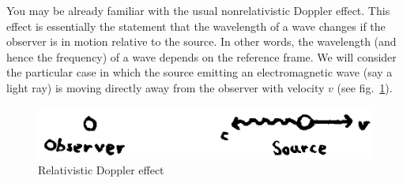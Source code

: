 \documentclass[11pt, a4paper,oneside,openright]{book}
\numberwithin{equation}{section}
\begin{document}
You may be already familiar with the usual nonrelativistic Doppler effect. This effect is essentially the statement that the wavelength of a wave changes if the observer is in motion relative to the source. In other words, the wavelength (and hence the frequency) of a wave depends on the reference frame. We will consider the particular case in which the source emitting an electromagnetic wave (say a light ray) is moving directly away from the observer with velocity $v$ (see fig.\ \ref{fig:lec4_7}).
\begin{figure}[ht]
\begin{center}
\includegraphics[scale=0.6]{Draw/lec4_7.png}
\end{center}
\caption{Relativistic Doppler effect}
\label{fig:lec4_7}
\end{figure}
\end{document}
